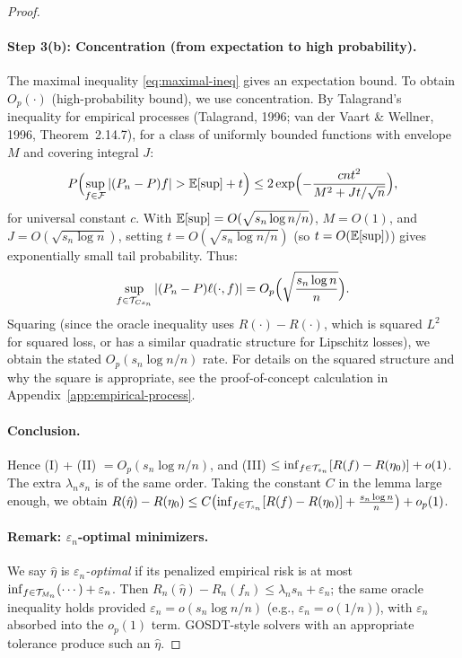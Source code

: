 \documentclass[12pt]{article}
\begin{document}
\begin{proof}
\paragraph{Step 3(b): Concentration (from expectation to high probability).}
The maximal inequality \eqref{eq:maximal-ineq} gives an expectation bound. To obtain $O_p(\cdot)$ (high-probability bound), we use concentration. By Talagrand's inequality for empirical processes (Talagrand, 1996; van der Vaart \& Wellner, 1996, Theorem~2.14.7), for a class of uniformly bounded functions with envelope $M$ and covering integral $J$:
\[
P\Bigl( \sup_{f \in \mathcal{F}} |(P_n - P)f| > \mathbb{E}[\sup] + t \Bigr) \le 2 \exp\Bigl( - \frac{cnt^2}{M^2 + J t / \sqrt{n}} \Bigr),
\]
for universal constant $c$. With $\mathbb{E}[\sup] = O(\sqrt{s_n \log n / n})$, $M = O(1)$, and $J = O(\sqrt{s_n \log n})$, setting $t = O(\sqrt{s_n \log n / n})$ (so $t = O(\mathbb{E}[\sup])$) gives exponentially small tail probability. Thus:
\[
\sup_{f \in \mathcal{T}_{Cs_n}} |(P_n - P) \ell(\cdot,f)| = O_p\Bigl(\sqrt{\frac{s_n \log n}{n}}\Bigr).
\]
Squaring (since the oracle inequality uses $R(\cdot) - R(\cdot)$, which is squared $L^2$ for squared loss, or has a similar quadratic structure for Lipschitz losses), we obtain the stated $O_p(s_n \log n / n)$ rate. For details on the squared structure and why the square is appropriate, see the proof-of-concept calculation in Appendix~\ref{app:empirical-process}.

\paragraph{Conclusion.}
Hence (I) + (II) $= O_p(s_n \log n / n)$, and (III) $\le \inf_{f \in \mathcal{T}_{s_n}}[R(f)-R(\eta_0)] + o(1)$. The extra $\lambda_n s_n$ is of the same order. Taking the constant $C$ in the lemma large enough, we obtain $R(\hat\eta) - R(\eta_0) \le C \bigl( \inf_{f \in \mathcal{T}_{s_n}}[R(f)-R(\eta_0)] + \frac{s_n \log n}{n} \bigr) + o_p(1)$.

\paragraph{Remark: $\varepsilon_n$-optimal minimizers.}
We say $\hat\eta$ is \emph{$\varepsilon_n$-optimal} if its penalized empirical risk is at most $\inf_{f \in \mathcal{T}_{M_n}}(\cdots) + \varepsilon_n$. Then $R_n(\hat\eta) - R_n(f_n) \le \lambda_n s_n + \varepsilon_n$; the same oracle inequality holds provided $\varepsilon_n = o(s_n \log n / n)$ (e.g., $\varepsilon_n = o(1/n)$), with $\varepsilon_n$ absorbed into the $o_p(1)$ term. GOSDT-style solvers with an appropriate tolerance produce such an $\hat\eta$.
\end{proof}
\end{document}
